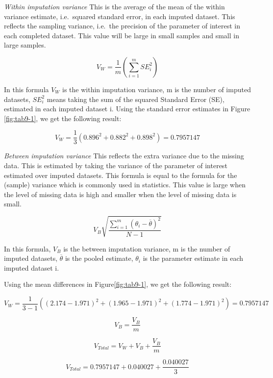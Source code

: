 \documentclass[]{book}
\begin{document}
\emph{Within imputation variance} This is the average of the mean of the
within variance estimate, i.e.~squared standard error, in each imputed
dataset. This reflects the sampling variance, i.e.~the precision of the
parameter of interest in each completed dataset. This value will be
large in small samples and small in large samples.

\begin{equation}
V_W = \frac{1}{m}\left (\sum_{i=1}^m{SE_i^2}\right )
  \label{eq:var-w}
\end{equation}

In this formula \(V_W\) is the within imputation variance, m is the
number of imputed datasets, \(SE_i^2\) means taking the sum of the
squared Standard Error (SE), estimated in each imputed dataset i. Using
the standard error estimates in Figure \ref{fig:tab9-1}, we get the
following result:

\[V_W = \frac{1}{3}(0.896^2 + 0.882^2 + 0.898^2)=0.7957147\]

\emph{Between imputation variance} This reflects the extra variance due
to the missing data. This is estimated by taking the variance of the
parameter of interest estimated over imputed datasets. This formula is
equal to the formula for the (sample) variance which is commonly used in
statistics. This value is large when the level of missing data is high
and smaller when the level of missing data is small.

\begin{equation}
V_B\sqrt{\frac{\sum_{i=1}^m (\theta_i - \overline{\theta})^2}{N-1} }
  \label{eq:var-b}
\end{equation}

In this formula, \(V_B\) is the between imputation variance, m is the
number of imputed datasets, \(\overline{\theta}\) is the pooled
estimate, \(\theta_i\) is the parameter estimate in each imputed dataset
i.

Using the mean differences in Figure\ref{fig:tab9-1}, we get the
following result:

\[V_W = \frac{1}{3-1}((2.174-1.971)^2+ (1.965-1.971)^2+(1.774-1.971)^2)=0.7957147\]

\[V_B = \frac{V_B}{m}\]

\begin{equation}
V_{Total} = V_W + V_B + \frac{V_B}{m}
  \label{eq:var-t}
\end{equation}

\[V_{Total} = 0.7957147+0.040027 + \frac{0.040027}{3}\]
\end{document}
